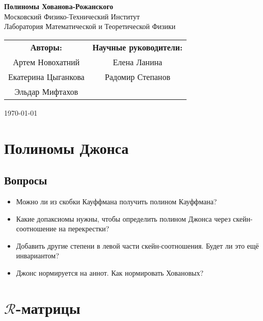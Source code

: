\documentclass[12pt,a4paper]{article}
\begin{document}
\begin{center}
    \Large \textbf{Полиномы Хованова-Рожанского} \\[1em]
    \small
    Московский Физико-Технический Институт \\[0.5em]
    Лаборатория Математической и Теоретической Физики
\end{center}

\small
\begin{flushright}
\begin{tabular}{c c}
\textbf{Авторы:} & \textbf{Научные руководители:} \\[0.5em]
Артем Новохатний & Елена Ланина \\
Екатерина Цыганкова & Радомир Степанов \\
Эльдар Мифтахов & \\
\end{tabular}

\vspace{1em}

\today
\end{flushright}
\normalsize
\vspace{2em}


\tableofcontents
\vspace{2em}

\section{Полиномы Джонса}

\subsection{Вопросы}
\begin{itemize}
    \item  Можно ли из скобки Кауффмана получить полином Кауффмана?
    \item  Какие допаксиомы нужны, чтобы определить полином Джонса через скейн-соотношение на перекрестки?
    \item  Добавить другие степени в левой части скейн-соотношения. Будет ли это ещё инвариантом?
    \item Джонс нормируется на аннот. Как нормировать Ховановых?
\end{itemize}

\section{$\mathcal{R}$-матрицы}
\end{document}
